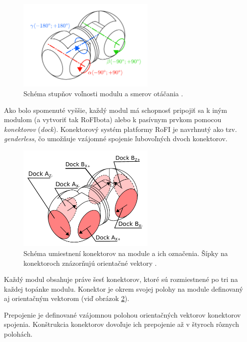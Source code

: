 \documentclass[
  printed, %
  oneside, %
  notable,   %
  nolof,     %
  nolot,     %
]{fithesis3}
\begin{document}
\begin{figure}[hbt!]
    \centering
    \includegraphics[width=0.6\textwidth]{pictures/module_angles.pdf}
    \caption[Stupne voľnosti modulu]{Schéma stupňov voľnosti modulu a smerov otáčania \cite{mrazekMasterThesis}.}
    \label{fig:module_angle}
\end{figure}

Ako bolo spomenuté vyššie, každý modul má schopnosť pripojiť sa k iným modulom (a vytvoriť tak RoFIbota) alebo k pasívnym prvkom pomocou \textit{konektorov} (\textit{dock}). Konektorový systém platformy RoFI je navrhnutý ako tzv. \textit{genderless}, čo umožňuje vzájomné spojenie ľubovoľných dvoch konektorov. 

\begin{figure}[hbt!]
    \centering
    \includegraphics[width=0.6\textwidth]{pictures/dock_desc.pdf}
    \caption[Konektory modulu]{Schéma umiestnení konektorov na module a ich označenia. Šípky na konektoroch znázorňujú orientačné vektory \cite{mrazekMasterThesis}.}
    \label{fig:dock_desc}
\end{figure}

Každý modul obsahuje práve šesť konektorov, ktoré sú rozmiestnené po tri na každej topánke modulu. Konektor je okrem svojej polohy na module definovaný aj orientačným vektorom (viď obrázok \ref{fig:dock_desc}). 


Prepojenie je definované vzájomnou polohou orientačných vektorov konektorov spojenia. Konštrukcia konektorov dovoľuje ich prepojenie až v štyroch rôznych polohách. 
\end{document}
